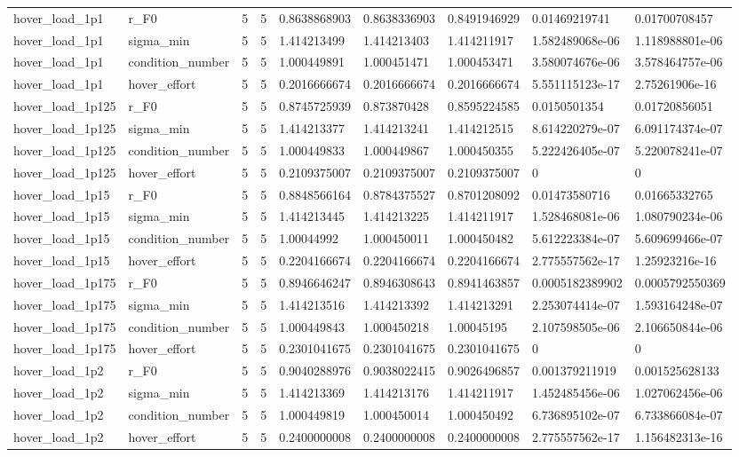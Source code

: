 \begin{tabular}{@{}lllllllll@{}}
hover\_load\_1p1 & r\_F0 & 5 & 5 & 0.8638868903 & 0.8638336903 & 0.8491946929 & 0.01469219741 & 0.01700708457 \\
hover\_load\_1p1 & sigma\_min & 5 & 5 & 1.414213499 & 1.414213403 & 1.414211917 & 1.582489068e-06 & 1.118988801e-06 \\
hover\_load\_1p1 & condition\_number & 5 & 5 & 1.000449891 & 1.000451471 & 1.000453471 & 3.580074676e-06 & 3.578464757e-06 \\
hover\_load\_1p1 & hover\_effort & 5 & 5 & 0.2016666674 & 0.2016666674 & 0.2016666674 & 5.551115123e-17 & 2.75261906e-16 \\
hover\_load\_1p125 & r\_F0 & 5 & 5 & 0.8745725939 & 0.873870428 & 0.8595224585 & 0.0150501354 & 0.01720856051 \\
hover\_load\_1p125 & sigma\_min & 5 & 5 & 1.414213377 & 1.414213241 & 1.414212515 & 8.614220279e-07 & 6.091174374e-07 \\
hover\_load\_1p125 & condition\_number & 5 & 5 & 1.000449833 & 1.000449867 & 1.000450355 & 5.222426405e-07 & 5.220078241e-07 \\
hover\_load\_1p125 & hover\_effort & 5 & 5 & 0.2109375007 & 0.2109375007 & 0.2109375007 & 0 & 0 \\
hover\_load\_1p15 & r\_F0 & 5 & 5 & 0.8848566164 & 0.8784375527 & 0.8701208092 & 0.01473580716 & 0.01665332765 \\
hover\_load\_1p15 & sigma\_min & 5 & 5 & 1.414213445 & 1.414213225 & 1.414211917 & 1.528468081e-06 & 1.080790234e-06 \\
hover\_load\_1p15 & condition\_number & 5 & 5 & 1.00044992 & 1.000450011 & 1.000450482 & 5.612223384e-07 & 5.609699466e-07 \\
hover\_load\_1p15 & hover\_effort & 5 & 5 & 0.2204166674 & 0.2204166674 & 0.2204166674 & 2.775557562e-17 & 1.25923216e-16 \\
hover\_load\_1p175 & r\_F0 & 5 & 5 & 0.8946646247 & 0.8946308643 & 0.8941463857 & 0.0005182389902 & 0.0005792550369 \\
hover\_load\_1p175 & sigma\_min & 5 & 5 & 1.414213516 & 1.414213392 & 1.414213291 & 2.253074414e-07 & 1.593164248e-07 \\
hover\_load\_1p175 & condition\_number & 5 & 5 & 1.000449843 & 1.000450218 & 1.00045195 & 2.107598505e-06 & 2.106650844e-06 \\
hover\_load\_1p175 & hover\_effort & 5 & 5 & 0.2301041675 & 0.2301041675 & 0.2301041675 & 0 & 0 \\
hover\_load\_1p2 & r\_F0 & 5 & 5 & 0.9040288976 & 0.9038022415 & 0.9026496857 & 0.001379211919 & 0.001525628133 \\
hover\_load\_1p2 & sigma\_min & 5 & 5 & 1.414213369 & 1.414213176 & 1.414211917 & 1.452485456e-06 & 1.027062456e-06 \\
hover\_load\_1p2 & condition\_number & 5 & 5 & 1.000449819 & 1.000450014 & 1.000450492 & 6.736895102e-07 & 6.733866084e-07 \\
hover\_load\_1p2 & hover\_effort & 5 & 5 & 0.2400000008 & 0.2400000008 & 0.2400000008 & 2.775557562e-17 & 1.156482313e-16 \\
\bottomrule
\end{tabular}
